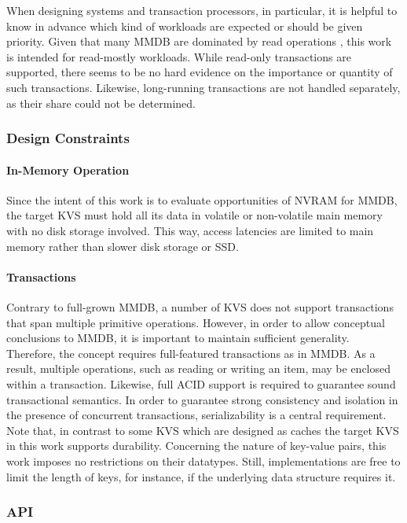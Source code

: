 When designing systems and transaction processors, in particular, it is helpful
to know in advance which kind of workloads are expected or should be given
priority. Given that many MMDB are dominated by read operations
\cite{andrei2017sap}, this work is intended for read-mostly workloads. While
read-only transactions are supported, there seems to be no hard evidence on the
importance or quantity of such transactions. Likewise, long-running transactions
are not handled separately, as their share could not be determined.

\subsubsection{Design Constraints}

\paragraph{In-Memory Operation}

Since the intent of this work is to evaluate opportunities of NVRAM for MMDB,
the target KVS must hold all its data in volatile or non-volatile main memory
with no disk storage involved. This way, access latencies are limited to main
memory rather than slower disk storage or SSD.

\paragraph{Transactions}

Contrary to full-grown MMDB, a number of KVS does not support transactions that
span multiple primitive operations. However, in order to allow conceptual
conclusions to MMDB, it is important to maintain sufficient generality.
Therefore, the concept requires full-featured transactions as in MMDB. As a
result, multiple operations, such as reading or writing an item, may be enclosed
within a transaction. Likewise, full ACID support is required to guarantee sound
transactional semantics. In order to guarantee strong consistency and isolation
in the presence of concurrent transactions, serializability is a central
requirement. Note that, in contrast to some KVS which are designed as caches the
target KVS in this work supports durability. Concerning the nature of key-value
pairs, this work imposes no restrictions on their datatypes. Still,
implementations are free to limit the length of keys, for instance, if the
underlying data structure requires it.

\subsubsection{API}

